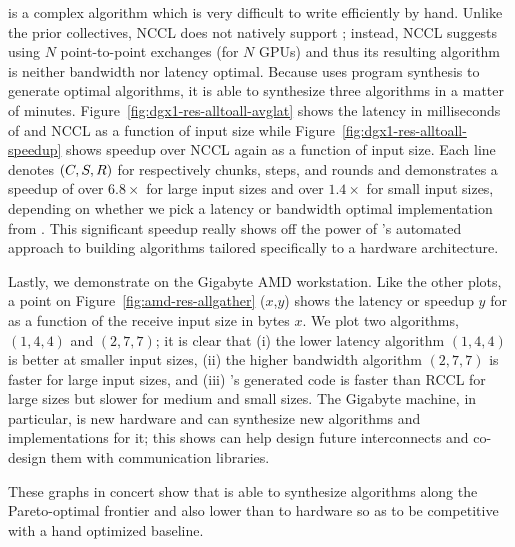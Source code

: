 \alltoall is a complex algorithm which is very difficult to write
efficiently by hand. Unlike the prior collectives, NCCL does not
natively support \alltoall; instead, NCCL suggests using $N$
point-to-point exchanges (for $N$ GPUs) and thus its resulting
algorithm is neither bandwidth nor latency optimal.  Because \tool{}
uses program synthesis to generate optimal algorithms, it is able to
synthesize three \alltoall{} algorithms in a matter of minutes.
Figure~\ref{fig:dgx1-res-alltoall-avglat} shows the latency in
milliseconds of \tool{} and NCCL as a function of input size while
Figure~\ref{fig:dgx1-res-alltoall-speedup} shows speedup over NCCL
again as a function of input size.  Each line denotes $(C,
S, R)$ for respectively chunks, steps, and rounds and
demonstrates a speedup of over $6.8\times$ for large input sizes and
over $1.4\times$ for small input sizes, depending on whether we pick a
latency or bandwidth optimal implementation from \tool.  This
significant speedup really shows off the power of \tool's automated
approach to building algorithms tailored specifically to a hardware
architecture.

Lastly, we demonstrate \allgather on the Gigabyte AMD workstation.
Like the other plots, a point on Figure~\ref{fig:amd-res-allgather}
($x$,$y$) shows the latency or speedup $y$ for \allgather as a
function of the receive input size in bytes $x$.  We plot two
algorithms, $(1,4,4)$ and $(2,7,7)$; it is clear that (i) the lower
latency algorithm $(1,4,4)$ is better at smaller input sizes, (ii) the
higher bandwidth algorithm $(2,7,7)$ is faster for large input sizes,
and (iii) \tool's generated code is faster than RCCL for large sizes
but slower for medium and small sizes. The Gigabyte machine, in
particular, is new hardware and \tool{} can synthesize new algorithms
and implementations for it; this shows \tool{} can help design future
interconnects and co-design them with communication libraries.

These graphs in concert show that \tool{} is able to synthesize
algorithms along the Pareto-optimal frontier and also lower than to
hardware so as to be competitive with a hand optimized baseline.

